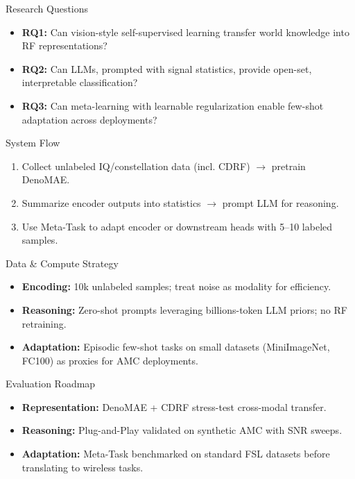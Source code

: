 \begin{frame}{Research Questions}
    \begin{itemize}
        \item \textbf{RQ1:} Can vision-style self-supervised learning transfer world knowledge into RF representations?
        \item \textbf{RQ2:} Can LLMs, prompted with signal statistics, provide open-set, interpretable classification?
        \item \textbf{RQ3:} Can meta-learning with learnable regularization enable few-shot adaptation across deployments?
    \end{itemize}
\end{frame}

\begin{frame}{System Flow}
    \begin{enumerate}
        \item Collect unlabeled IQ/constellation data (incl. CDRF) $\rightarrow$ pretrain DenoMAE.
        \item Summarize encoder outputs into statistics $\rightarrow$ prompt LLM for reasoning.
        \item Use Meta-Task to adapt encoder or downstream heads with 5–10 labeled samples.
    \end{enumerate}
\end{frame}

\begin{frame}{Data \& Compute Strategy}
    \begin{itemize}
        \item \textbf{Encoding:} 10k unlabeled samples; treat noise as modality for efficiency.
        \item \textbf{Reasoning:} Zero-shot prompts leveraging billions-token LLM priors; no RF retraining.
        \item \textbf{Adaptation:} Episodic few-shot tasks on small datasets (MiniImageNet, FC100) as proxies for AMC deployments.
    \end{itemize}
\end{frame}

\begin{frame}{Evaluation Roadmap}
    \begin{itemize}
        \item \textbf{Representation:} DenoMAE + CDRF stress-test cross-modal transfer.
        \item \textbf{Reasoning:} Plug-and-Play validated on synthetic AMC with SNR sweeps.
        \item \textbf{Adaptation:} Meta-Task benchmarked on standard FSL datasets before translating to wireless tasks.
    \end{itemize}
\end{frame}

